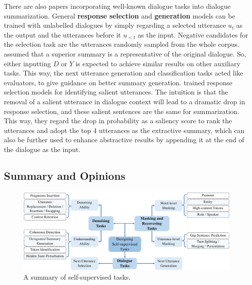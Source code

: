 There are also papers incorporating
well-known {dialogue tasks} into dialogue summarization. General \textbf{response 
selection} and \textbf{generation} models can be trained with unlabelled dialogues by 
simply regarding a selected utterance $u_t$ as the output and 
the utterances before it $u_{<t}$ as the input. Negative candidates for 
the selection task are the utterances randomly sampled from the whole corpus.
\citet{fuzw20} assumed that a superior summary is a representative of the 
original dialogue. So, either inputting $D$ or $Y$ is expected to achieve 
similar results on other auxiliary tasks. This way, the next utterance generation 
and classification tasks {acted like evaluators, to give guidance on better summary generation}.
\citet{feigenblat-etal-2021-tweetsumm-dialog} trained response selection models for identifying salient utterances.
The intuition is that the removal of a salient utterance in dialogue context 
will lead to a dramatic drop in response selection, 
and these salient sentences are the same for summarization. 
This way, they regard the drop in probability as a saliency score to 
rank the utterances and adopt the top 4 utterances as the
extractive summary, which can also be further used to enhance abstractive 
results by appending it at the end of the dialogue as the input.

\subsection{Summary and Opinions}

\begin{figure}
	\centering
	\includegraphics[scale=0.7]{fig/approach-tasks.pdf}
	\caption{A summary of self-supervised tasks.}
	\label{fig:app-task}
\end{figure}

